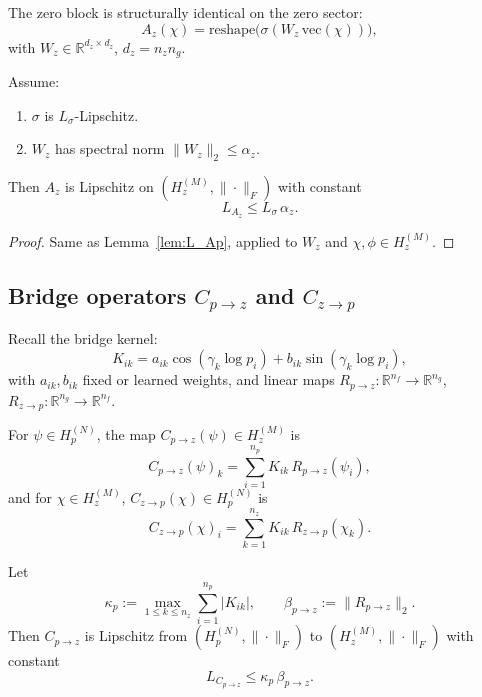 \documentclass[11pt]{article}
\theoremstyle{definition}
\theoremstyle{plain}
\begin{document}
The zero block is structurally identical on the zero sector:
\[
  A_z(\chi)
  = \mathrm{reshape}\bigl(\sigma(W_z\,\mathrm{vec}(\chi))\bigr),
\]
with $W_z \in \mathbb{R}^{d_z \times d_z}$, $d_z = n_z n_g$.

\begin{lemma}\label{lem:L_Az}
Assume:
\begin{enumerate}[label=(\roman*), leftmargin=*]
  \item $\sigma$ is $L_\sigma$-Lipschitz.
  \item $W_z$ has spectral norm $\|W_z\|_2\le\alpha_z$.
\end{enumerate}
Then $A_z$ is Lipschitz on $(H_z^{(M)},\|\cdot\|_F)$ with constant
\[
  L_{A_z} \le L_\sigma\,\alpha_z.
\]
\end{lemma}

\begin{proof}
Same as Lemma~\ref{lem:L_Ap}, applied to $W_z$ and $\chi,\phi\in H_z^{(M)}$.
\end{proof}

\subsection{Bridge operators \texorpdfstring{$C_{p\to z}$}{Cpz} and \texorpdfstring{$C_{z\to p}$}{Czp}}

Recall the bridge kernel:
\[
  K_{ik}
  = a_{ik}\cos(\gamma_k \log p_i) + b_{ik}\sin(\gamma_k \log p_i),
\]
with $a_{ik},b_{ik}$ fixed or learned weights, and linear maps $R_{p\to z}:\mathbb{R}^{n_f}\to\mathbb{R}^{n_g}$, $R_{z\to p}:\mathbb{R}^{n_g}\to\mathbb{R}^{n_f}$.

For $\psi\in H_p^{(N)}$, the map $C_{p\to z}(\psi)\in H_z^{(M)}$ is
\[
  C_{p\to z}(\psi)_k
  = \sum_{i=1}^{n_p} K_{ik}\,R_{p\to z}(\psi_i),
\]
and for $\chi\in H_z^{(M)}$, $C_{z\to p}(\chi)\in H_p^{(N)}$ is
\[
  C_{z\to p}(\chi)_i
  = \sum_{k=1}^{n_z} K_{ik}\,R_{z\to p}(\chi_k).
\]

\begin{lemma}\label{lem:L_Cpz}
Let
\[
  \kappa_p := \max_{1\le k\le n_z} \sum_{i=1}^{n_p} |K_{ik}|,
  \qquad
  \beta_{p\to z} := \|R_{p\to z}\|_{2}.
\]
Then $C_{p\to z}$ is Lipschitz from $(H_p^{(N)},\|\cdot\|_F)$ to $(H_z^{(M)},\|\cdot\|_F)$ with constant
\[
  L_{C_{p\to z}} \le \kappa_p\,\beta_{p\to z}.
\]
\end{lemma}
\end{document}
